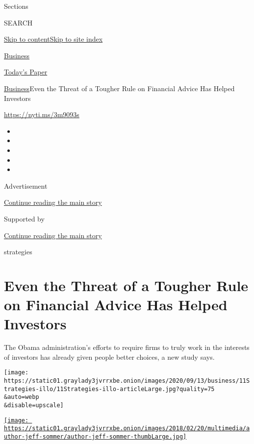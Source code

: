 Sections

SEARCH

\protect\hyperlink{site-content}{Skip to
content}\protect\hyperlink{site-index}{Skip to site index}

\href{https://www.nytimes3xbfgragh.onion/section/business}{Business}

\href{https://myaccount.nytimes3xbfgragh.onion/auth/login?response_type=cookie\&client_id=vi}{}

\href{https://www.nytimes3xbfgragh.onion/section/todayspaper}{Today's
Paper}

\href{/section/business}{Business}\textbar{}Even the Threat of a Tougher
Rule on Financial Advice Has Helped Investors

\url{https://nyti.ms/3m9093s}

\begin{itemize}
\item
\item
\item
\item
\item
\end{itemize}

Advertisement

\protect\hyperlink{after-top}{Continue reading the main story}

Supported by

\protect\hyperlink{after-sponsor}{Continue reading the main story}

strategies

\hypertarget{even-the-threat-of-a-tougher-rule-on-financial-advice-has-helped-investors}{%
\section{Even the Threat of a Tougher Rule on Financial Advice Has
Helped
Investors}\label{even-the-threat-of-a-tougher-rule-on-financial-advice-has-helped-investors}}

The Obama administration's efforts to require firms to truly work in the
interests of investors has already given people better choices, a new
study says.

\texttt{[image: https://static01.graylady3jvrrxbe.onion/images/2020/09/13/business/11Strategies-illo/11Strategies-illo-articleLarge.jpg?quality=75\\\&auto=webp\\\&disable=upscale]}

\href{https://www.nytimes3xbfgragh.onion/by/jeff-sommer}{\texttt{[image: https://static01.graylady3jvrrxbe.onion/images/2018/02/20/multimedia/author-jeff-sommer/author-jeff-sommer-thumbLarge.jpg]}}

